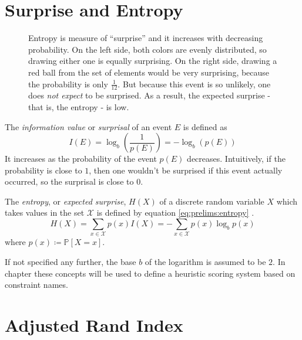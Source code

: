 		\clearpage
	
	\section{Surprise and Entropy}
	
		\begin{figure}[ht!]
			\centering
			
			\caption{Entropy is measure of \enquote{surprise} and it increases with decreasing probability. On the left side, both colors are evenly distributed, so drawing either one is equally surprising. On the right side, drawing a red ball from the set of elements would be very surprising, because the probability is only $\frac{1}{12}$. But because this event is so unlikely, one does \textit{not expect} to be surprised. As a result, the expected surprise - that is, the entropy - is low.}
			\label{figure:prelim:entropy}
		\end{figure}
	
		The \textit{information value} or \textit{surprisal} of an event $E$ is defined as
		\begin{equation}
			I(E) = \log_b \left( \frac{1}{p(E)} \right) = - \log_b \left( p(E) \right)
		\end{equation}
		It increases as the probability of the event $p(E)$ decreases.
		Intuitively, if the probability is close to $1$, then one wouldn't be surprised if this event actually occurred, so the surprisal is close to $0$.
		
		The \textit{entropy}, or \textit{expected surprise}, $H(X)$ of a discrete random variable $X$ which takes values in the set $\mathcal{X}$ is defined by equation \ref{eq:prelims:entropy} \cite{coverElementsInformationTheory2006}.
		\begin{equation}
		\label{eq:prelims:entropy}
			H(X) =  \sum_{x \in \mathcal{X}} p(x) I(X) = - \sum_{x \in \mathcal{X}} p(x) \log_b p(x)
		\end{equation}
		where $p(x) \coloneq \mathbb{P}[X = x]$.
		
		If not specified any further, the base $b$ of the logarithm is assumed to be $2$.
		In chapter  these concepts will be used to define a heuristic scoring system based on constraint names.
		
	\section{Adjusted Rand Index}
	\label{chap:prelims:rand}
	
